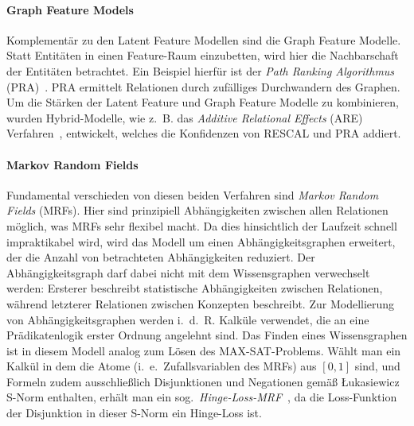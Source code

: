 \paragraph{Graph Feature Models}
Komplementär zu den Latent Feature Modellen sind die Graph Feature Modelle.
Statt Entitäten in einen Feature-Raum einzubetten, wird hier die Nachbarschaft der Entitäten betrachtet.
Ein Beispiel hierfür ist der \textit{Path Ranking Algorithmus} (PRA)~\cite{Lao2011}. PRA ermittelt Relationen durch zufälliges Durchwandern des Graphen.
Um die Stärken der Latent Feature und Graph Feature Modelle zu kombinieren, wurden Hybrid-Modelle, wie z.~B. das \textit{Additive Relational Effects} (ARE) Verfahren~\cite{Nickel2014}, entwickelt, welches die Konfidenzen von RESCAL und PRA addiert.

\paragraph{Markov Random Fields}
Fundamental verschieden von diesen beiden Verfahren sind \textit{Markov Random Fields} (MRFs).
Hier sind prinzipiell Abhängigkeiten zwischen allen Relationen möglich, was MRFs sehr flexibel macht.
Da dies hinsichtlich der Laufzeit schnell impraktikabel wird, wird das Modell um einen Abhängigkeitsgraphen erweitert, der die Anzahl von betrachteten Abhängigkeiten reduziert.
Der Abhängigkeitsgraph darf dabei nicht mit dem Wissensgraphen verwechselt werden:
Ersterer beschreibt statistische Abhängigkeiten zwischen Relationen, während letzterer Relationen zwischen Konzepten beschreibt.
Zur Modellierung von Abhängigkeitsgraphen werden i.~d.~R. Kalküle verwendet, die an eine Prädikatenlogik erster Ordnung angelehnt sind.
Das Finden eines Wissensgraphen ist in diesem Modell analog zum Lösen des MAX-SAT-Problems.
Wählt man ein Kalkül in dem die Atome (i.~e.\ Zufallsvariablen des MRFs) aus $[0, 1]$ sind, und Formeln zudem ausschließlich Disjunktionen und Negationen gemäß Łukasiewicz S-Norm enthalten, erhält man ein sog.\ \textit{Hinge-Loss-MRF}~\cite{Bach2013}\cite{Bach2015}, da die Loss-Funktion der Disjunktion in dieser S-Norm ein Hinge-Loss ist.

